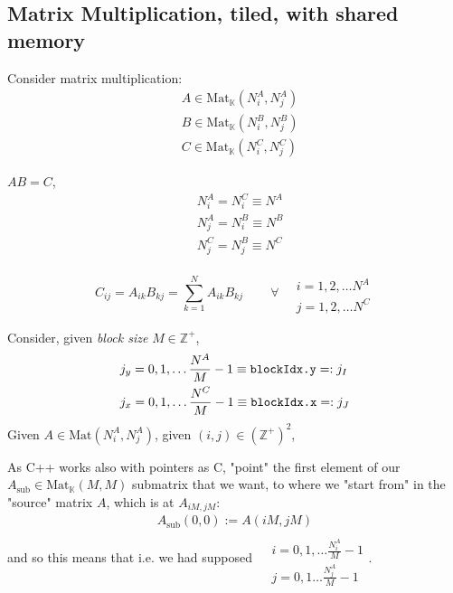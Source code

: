 \documentclass[10pt]{amsart}
\begin{document}
\begin{multicols*}{2}



\section{Matrix Multiplication, tiled, with shared memory}

Consider matrix multiplication:  
\[
\begin{aligned}
	& A \in \text{Mat}_{\mathbb{K}}(N_i^A, N_j^A)  \\ 
	& B \in \text{Mat}_{\mathbb{K}}(N_i^B, N_j^B)  \\
	& C \in \text{Mat}_{\mathbb{K}}(N_i^C, N_j^C)  
\end{aligned}
\]

$AB=C$, 
\[
\begin{aligned}
	& N_i^A = N_i^C \equiv N^A \\ 
	& N_j^A = N_i^B \equiv N^B \\ 
	& N_j^C = N_j^B \equiv N^C 
\end{aligned}
\]

\[
C_{ij} = A_{ik}B_{kj} = \sum_{k=1}^N A_{ik} B_{kj} \qquad \, \forall \, \begin{aligned} & \quad \\ 
	& i=1,2,\dots N^A \\
	& j = 1,2,\dots N^C \end{aligned}
\]

Consider, given \emph{block size} $M\in \mathbb{Z}^+$, 
\[
\begin{aligned}
	& j_y = 0,1,\dots \frac{N^A}{M} - 1 \equiv \verb|blockIdx.y| =: j_I \\
	& j_x = 0,1,\dots \frac{N^C}{M} -1 \equiv \verb|blockIdx.x| =: j_J 
\end{aligned}
\]
Given $A \in \text{Mat}(N_i^A, N_j^A)$, given $(i,j) \in (\mathbb{Z}^+)^2$, 

As C++ works also with pointers as C, "point" the first element of our $A_{\text{sub}} \in \text{Mat}_{\mathbb{K}}(M,M)$ submatrix that we want, to where we "start from" in the "source" matrix $A$, which is at $A_{iM,jM}$:
\[
\begin{gathered}
	A_{\text{sub}}(0,0):=A(iM,jM) 
\end{gathered}
\]
and so this means that i.e. we had supposed $\begin{aligned} & \quad \\
& i=0,1,\dots \frac{N_i^A}{M} - 1 \\
& j=0,1\dots \frac{N_j^A}{M}-1 \end{aligned}$.  


\end{multicols*}
\end{document}
